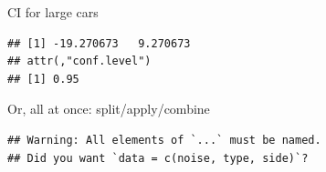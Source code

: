 \documentclass[ignorenonframetext,]{beamer}
\newenvironment{Shaded}{\begin{snugshade}}{\end{snugshade}}
\newcommand{\ControlFlowTok}[1]{\textcolor[rgb]{0.13,0.29,0.53}{\textbf{#1}}}
\newcommand{\DataTypeTok}[1]{\textcolor[rgb]{0.13,0.29,0.53}{#1}}
\newcommand{\KeywordTok}[1]{\textcolor[rgb]{0.13,0.29,0.53}{\textbf{#1}}}
\newcommand{\NormalTok}[1]{#1}
\newcommand{\OperatorTok}[1]{\textcolor[rgb]{0.81,0.36,0.00}{\textbf{#1}}}
\newcommand{\StringTok}[1]{\textcolor[rgb]{0.31,0.60,0.02}{#1}}
\begin{document}
\begin{frame}[fragile]{CI for large cars}
\protect\hypertarget{ci-for-large-cars}{}

\begin{Shaded}
\end{Shaded}

\begin{verbatim}
## [1] -19.270673   9.270673
## attr(,"conf.level")
## [1] 0.95
\end{verbatim}

\end{frame}

\begin{frame}[fragile]{Or, all at once: split/apply/combine}
\protect\hypertarget{or-all-at-once-splitapplycombine}{}

\scriptsize

\begin{Shaded}
\end{Shaded}

\begin{verbatim}
## Warning: All elements of `...` must be named.
## Did you want `data = c(noise, type, side)`?
\end{verbatim}

\normalsize

\end{frame}
\end{document}
